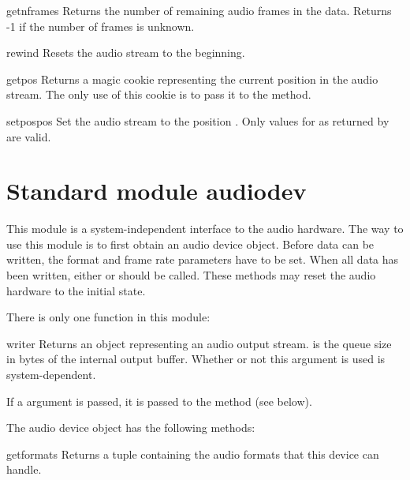 \begin{funcdesc}{getnframes}{}
Returns the number of remaining audio frames in the data.  Returns -1
if the number of frames is unknown.
\end{funcdesc}

\begin{funcdesc}{rewind}{}
Resets the audio stream to the beginning.
\end{funcdesc}

\begin{funcdesc}{getpos}{}
Returns a magic cookie representing the current position in the audio
stream.  The only use of this cookie is to pass it to the
 method.
\end{funcdesc}

\begin{funcdesc}{setpos}{pos}
Set the audio stream to the position .  Only values for
 as returned by  are valid.
\end{funcdesc}

\section{Standard module audiodev}
\renewcommand{\indexsubitem}{(in module audiodev)}

This module is a system-independent interface to the audio hardware.
The way to use this module is to first obtain an audio device object.
Before data can be written, the format and frame rate parameters have
to be set.  When all data has been written, either  or
 should be called.  These methods may reset the audio
hardware to the initial state.

There is only one function in this module:

\begin{funcdesc}{writer}{}
Returns an object representing an audio output stream.   is
the queue size in bytes of the internal output buffer.  Whether or not
this argument is used is system-dependent.

If a  argument is passed, it is passed to the 
method (see below).
\end{funcdesc}

The audio device object has the following methods:
\renewcommand{\indexsubitem}{(audio device output object methods)}

\begin{funcdesc}{getformats}{}
Returns a tuple containing the audio formats that this device can
handle.
\end{funcdesc}

